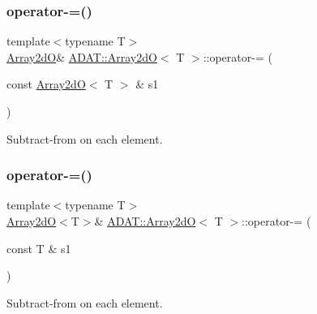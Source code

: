 \subsubsection{\texorpdfstring{operator-\/=()}{operator-=()}\hspace{0.1cm}{\footnotesize\ttfamily [3/6]}}
{\footnotesize\ttfamily template$<$typename T$>$ \\
\mbox{\hyperlink{classADAT_1_1Array2dO}{Array2dO}}\& \mbox{\hyperlink{classADAT_1_1Array2dO}{A\+D\+A\+T\+::\+Array2dO}}$<$ T $>$\+::operator-\/= (\begin{DoxyParamCaption}\item[{const \mbox{\hyperlink{classADAT_1_1Array2dO}{Array2dO}}$<$ T $>$ \&}]{s1 }\end{DoxyParamCaption})\hspace{0.3cm}{\ttfamily [inline]}}



Subtract-\/from on each element. 

\mbox{\label{classADAT_1_1Array2dO_a5facf357c8c8f28555fe851dce2d039c}} 
\subsubsection{\texorpdfstring{operator-\/=()}{operator-=()}\hspace{0.1cm}{\footnotesize\ttfamily [4/6]}}
{\footnotesize\ttfamily template$<$typename T$>$ \\
\mbox{\hyperlink{classADAT_1_1Array2dO}{Array2dO}}$<$T$>$\& \mbox{\hyperlink{classADAT_1_1Array2dO}{A\+D\+A\+T\+::\+Array2dO}}$<$ T $>$\+::operator-\/= (\begin{DoxyParamCaption}\item[{const T \&}]{s1 }\end{DoxyParamCaption})\hspace{0.3cm}{\ttfamily [inline]}}



Subtract-\/from on each element. 

\mbox{\label{classADAT_1_1Array2dO_a5facf357c8c8f28555fe851dce2d039c}} 
